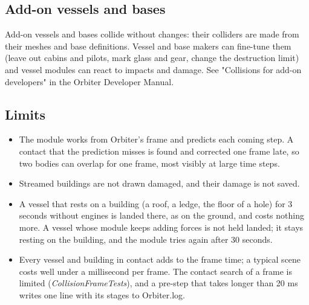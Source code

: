 \documentclass[Orbiter User Manual.tex]{subfiles}
\begin{document}
\subsection{Add-on vessels and bases}
Add-on vessels and bases collide without changes: their colliders are made from their meshes and base definitions. Vessel and base makers can fine-tune them (leave out cabins and pilots, mark glass and gear, change the destruction limit) and vessel modules can react to impacts and damage. See "Collisions for add-on developers" in the Orbiter Developer Manual.


\subsection{Limits}
\begin{itemize}
\item The module works from Orbiter's frame and predicts each coming step. A contact that the prediction misses is found and corrected one frame late, so two bodies can overlap for one frame, most visibly at large time steps.
\item Streamed buildings are not drawn damaged, and their damage is not saved.
\item A vessel that rests on a building (a roof, a ledge, the floor of a hole) for 3 seconds without engines is landed there, as on the ground, and costs nothing more. A vessel whose module keeps adding forces is not held landed; it stays resting on the building, and the module tries again after 30 seconds.
\item Every vessel and building in contact adds to the frame time; a typical scene costs well under a millisecond per frame. The contact search of a frame is limited (\textit{CollisionFrameTests}), and a pre-step that takes longer than 20 ms writes one line with its stages to Orbiter.log.
\end{itemize}
\end{document}
